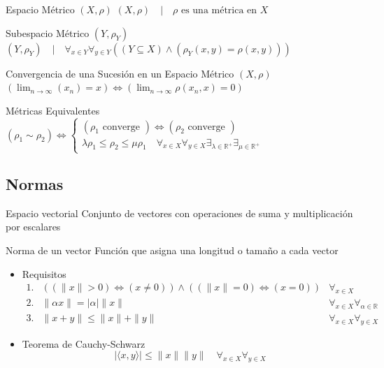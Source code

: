 \documentclass[a4paper,11pt]{article}
\begin{document}
\begin{definicion*}{Espacio Métrico $(X,\rho)$}{}
  $ (X,\rho) \quad | \quad \rho \text{ es una métrica en } X $
\end{definicion*}

\begin{definicion*}{Subespacio Métrico $(Y,\rho_Y)$}{}
  $ (Y,\rho_Y) \quad | \quad \forall_{x \in Y} \forall_{y \in Y} \left( (Y \subseteq X) \wedge (\rho_Y(x,y) = \rho(x,y)) \right) $
\end{definicion*}

\begin{definicion*}{Convergencia de una Sucesión en un Espacio Métrico $(X,\rho)$}{}
  $\left( \lim_{n \to \infty} (x_n) = x \right) \Leftrightarrow \left(\lim_{n \to \infty} \rho(x_n,x) = 0 \right)$
\end{definicion*}

\begin{definicion*}{Métricas Equivalentes}{}
  $\left( \rho_1 \sim \rho_2 \right) \Leftrightarrow \begin{cases}
    (\rho_1 \text{ converge }) \Leftrightarrow (\rho_2 \text{ converge }) \\
    \lambda \rho_1 \leq \rho_2 \leq \mu \rho_1 \quad \forall_{x \in X}\forall_{y \in X}\exists_{\lambda \in \mathbb{R}^+} \exists_{\mu \in \mathbb{R}^+}
  \end{cases}$
\end{definicion*}

\newpage
\subsection{Normas}

\begin{definicion*}{Espacio vectorial}{}
  Conjunto de vectores con operaciones de suma y multiplicación por escalares
\end{definicion*}
  
\begin{definicion*}{Norma de un vector}{}
  Función que asigna una longitud o tamaño a cada vector
  \begin{itemize}
    \item Requisitos
    \[
    \begin{array}{lll}
      1. & \left( (\|x\| > 0) \Leftrightarrow (x \neq 0) \right) \wedge \left( (\|x\| = 0) \Leftrightarrow (x = 0) \right) & \forall_{x \in X} \\
      2. & \|\alpha x\| = |\alpha| \|x\| & \forall_{x \in X}\forall_{\alpha \in \mathbb{R}} \\
      3. & \|x+y\| \leq \|x\| + \|y\| & \forall_{x \in X}\forall_{y \in X}
    \end{array}
    \]
    \item Teorema de Cauchy-Schwarz
    \begin{equation*}
      |\langle x,y \rangle| \leq \|x\| \|y\| \quad \forall_{x \in X}\forall_{y \in X}
    \end{equation*}
  \end{itemize}
\end{definicion*}
\end{document}
